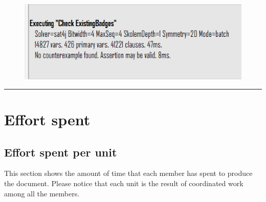 \documentclass{Configuration_Files/Template}
\begin{document}
\begin{figure}[H]
\includegraphics[scale = 0.7]{Images/Alloy/3Outcome.png}\\
\centering
\end{figure}

{\color{bluepoli}\rule{\linewidth}{0.1pt}}


\chapter{Effort spent}

\section{Effort spent per unit}

This section shows the amount of time that each member has spent to produce the document. Please notice that each unit is the result of coordinated work among all the members.
\end{document}
